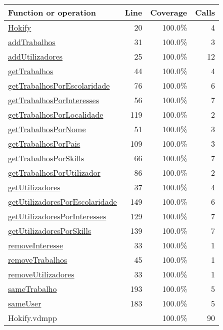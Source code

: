 \begin{longtable}{|l|r|r|r|}
\hline
Function or operation & Line & Coverage & Calls \\
\hline
\hline
\hyperref[Hokify:20]{Hokify} & 20&100.0\% & 4 \\
\hline
\hyperref[addTrabalhos:31]{addTrabalhos} & 31&100.0\% & 3 \\
\hline
\hyperref[addUtilizadores:25]{addUtilizadores} & 25&100.0\% & 12 \\
\hline
\hyperref[getTrabalhos:44]{getTrabalhos} & 44&100.0\% & 4 \\
\hline
\hyperref[getTrabalhosPorEscolaridade:76]{getTrabalhosPorEscolaridade} & 76&100.0\% & 6 \\
\hline
\hyperref[getTrabalhosPorInteresses:56]{getTrabalhosPorInteresses} & 56&100.0\% & 7 \\
\hline
\hyperref[getTrabalhosPorLocalidade:119]{getTrabalhosPorLocalidade} & 119&100.0\% & 2 \\
\hline
\hyperref[getTrabalhosPorNome:51]{getTrabalhosPorNome} & 51&100.0\% & 3 \\
\hline
\hyperref[getTrabalhosPorPais:109]{getTrabalhosPorPais} & 109&100.0\% & 3 \\
\hline
\hyperref[getTrabalhosPorSkills:66]{getTrabalhosPorSkills} & 66&100.0\% & 7 \\
\hline
\hyperref[getTrabalhosPorUtilizador:86]{getTrabalhosPorUtilizador} & 86&100.0\% & 2 \\
\hline
\hyperref[getUtilizadores:37]{getUtilizadores} & 37&100.0\% & 4 \\
\hline
\hyperref[getUtilizadoresPorEscolaridade:149]{getUtilizadoresPorEscolaridade} & 149&100.0\% & 6 \\
\hline
\hyperref[getUtilizadoresPorInteresses:129]{getUtilizadoresPorInteresses} & 129&100.0\% & 7 \\
\hline
\hyperref[getUtilizadoresPorSkills:139]{getUtilizadoresPorSkills} & 139&100.0\% & 7 \\
\hline
\hyperref[removeInteresse:33]{removeInteresse} & 33&100.0\% & 1 \\
\hline
\hyperref[removeTrabalhos:45]{removeTrabalhos} & 45&100.0\% & 1 \\
\hline
\hyperref[removeUtilizadores:33]{removeUtilizadores} & 33&100.0\% & 1 \\
\hline
\hyperref[sameTrabalho:193]{sameTrabalho} & 193&100.0\% & 5 \\
\hline
\hyperref[sameUser:183]{sameUser} & 183&100.0\% & 5 \\
\hline
\hline
Hokify.vdmpp & & 100.0\% & 90 \\
\hline
\end{longtable}

